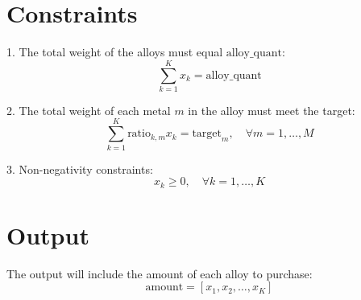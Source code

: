 \documentclass{article}
\begin{document}
\section*{Constraints}

1. The total weight of the alloys must equal \( \text{alloy\_quant} \):
\[
\sum_{k=1}^{K} x_k = \text{alloy\_quant}
\]

2. The total weight of each metal \( m \) in the alloy must meet the target:
\[
\sum_{k=1}^{K} \text{ratio}_{k, m} x_k = \text{target}_{m}, \quad \forall m = 1, \ldots, M
\]

3. Non-negativity constraints:
\[
x_k \geq 0, \quad \forall k = 1, \ldots, K
\]

\section*{Output}

The output will include the amount of each alloy to purchase:
\[
\text{amount} = [x_{1}, x_{2}, \ldots, x_{K}]
\]
\end{document}

